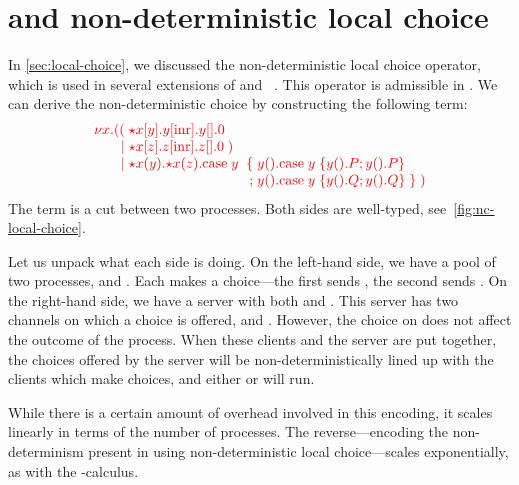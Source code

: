\section{\nodcap and non-deterministic local choice}\label{sec:nc-local-choice}
In \cref{sec:local-choice}, we discussed the non-deterministic local choice
operator, which is used in several extensions of \piDILL and
\cp~\cite{atkey2016,caires2014,caires2017}.
This operator is admissible in \nodcap.
We can derive the non-deterministic choice  by constructing the
following term:
\[
  \arraycolsep=0pt
  \tm{
  \begin{array}{lrlrl}
    \nu x.&((  & \; \ncCnt{x}{y}{\cpInr{y}{\cpHalt{y}}} \\
          &\mid& \; \ncCnt{x}{z}{\cpInr{z}{\cpHalt{z}}} \; )\\
          &\mid& \; \ncSrv{x}{y}{\ncSrv{x}{z}{}}\text{case}\;y\;
          &\;\{& \; \cpWait{y}{\cpCase{y}{\cpWait{y}{P}}{\cpWait{y}{P}}}\\
          &&& ;& \; \cpWait{y}{\cpCase{y}{\cpWait{y}{Q}}{\cpWait{y}{Q}}}\;\}\;)
  \end{array}
  }
\]
The term is a cut between two processes.
Both sides are well-typed, see~\cref{fig:nc-local-choice}.

Let us unpack what each side is doing. 
On the left-hand side, we have a pool of two processes,
 and .
Each makes a choice---the first sends , the second sends .
On the right-hand side, we have a server with both  and .
This server has two channels on which a choice is offered,  and
. However, the choice on  does not affect the outcome of the
process.
When these clients and the server are put together, the choices offered by the
server will be non-deterministically lined up with the clients which make
choices, and either  or  will run.

While there is a certain amount of overhead involved in this encoding, it scales
linearly in terms of the number of processes.
The reverse---encoding the non-determinism present in \nodcap using
non-deterministic local choice---scales exponentially, as with the \textpi-calculus.

